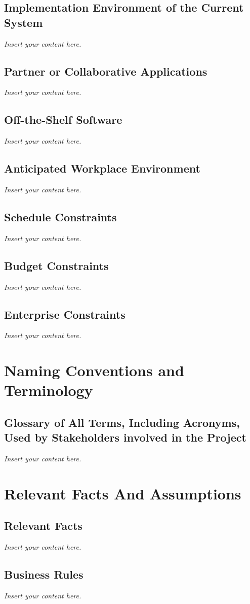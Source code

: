 \documentclass[12pt]{article}
\newcommand{\lips}{\textit{Insert your content here.}}
\begin{document}
\subsection{Implementation Environment of the Current System}
\lips
\subsection{Partner or Collaborative Applications}
\lips
\subsection{Off-the-Shelf Software}
\lips
\subsection{Anticipated Workplace Environment}
\lips
\subsection{Schedule Constraints}
\lips
\subsection{Budget Constraints}
\lips
\subsection{Enterprise Constraints}
\lips

\section{Naming Conventions and Terminology}
\subsection{Glossary of All Terms, Including Acronyms, Used by Stakeholders
involved in the Project}
\lips

\section{Relevant Facts And Assumptions}
\subsection{Relevant Facts}
\lips
\subsection{Business Rules}
\lips
\end{document}
